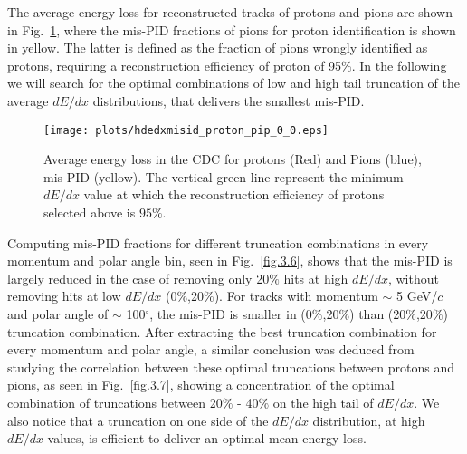 The average energy loss for reconstructed tracks of protons and pions are shown in Fig.~\ref{fig.3.5}, where the mis-PID fractions of pions for proton identification is shown in yellow. The latter is defined as the fraction of pions wrongly identified as protons, requiring a reconstruction efficiency of proton of 95$\%$. In the following we will search for the optimal combinations of low and high tail truncation of the average $dE/dx$ distributions, that delivers the smallest mis-PID.

\begin{figure}[H]
    \centering
    \texttt{[image: plots/hdedxmisid\_proton\_pip\_0\_0.eps]}
    \caption{\label{fig.3.5}Average energy loss in the CDC for protons (Red) and Pions (blue), mis-PID (yellow). The vertical green line represent the minimum $dE/dx$ value at which the reconstruction efficiency of protons selected above is $95\%$.}
\end{figure}

Computing mis-PID fractions for different truncation combinations in every momentum and polar angle bin, seen in Fig.~\ref{fig.3.6}, shows that the mis-PID is largely reduced in the case of removing only 20$\%$ hits at high $dE/dx$, without removing hits at low $dE/dx$ (0$\%$,20$\%$). For tracks with momentum $\sim$ 5 GeV/$c$ and polar angle of $\sim$ 100$^{\circ}$, the mis-PID is smaller in (0$\%$,20$\%$) than (20$\%$,20$\%$) truncation combination. After extracting the best truncation combination for every momentum and polar angle, a similar conclusion was deduced from studying the correlation between these optimal truncations between protons and pions, as seen in Fig.~\ref{fig.3.7}, showing a concentration of the optimal combination of truncations between 20$\%$ - 40$\%$ on the high tail of $dE/dx$. We also notice that a truncation on one side of the $dE/dx$ distribution, at high $dE/dx$ values, is efficient to deliver an optimal mean energy loss.

